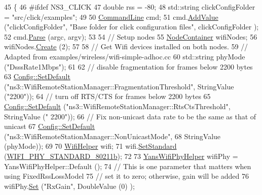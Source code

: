 \begin{DoxyCode}
45 \{
46 \textcolor{preprocessor}{#ifdef NS3\_CLICK}
47   \textcolor{keywordtype}{double} rss = -80;
48   std::string clickConfigFolder = \textcolor{stringliteral}{"src/click/examples"};
49 
50   \hyperlink{classns3_1_1CommandLine}{CommandLine} cmd;
51   cmd.\hyperlink{classns3_1_1CommandLine_addcfb546c7ad4c8bd0965654d55beb8e}{AddValue} (\textcolor{stringliteral}{"clickConfigFolder"}, \textcolor{stringliteral}{"Base folder for click configuration files"}, clickConfigFolder
      );
52   cmd.\hyperlink{classns3_1_1CommandLine_a5c10b85b3207e5ecb48d907966923156}{Parse} (argc, argv);
53 
54   \textcolor{comment}{// Setup nodes}
55   \hyperlink{classns3_1_1NodeContainer}{NodeContainer} wifiNodes;
56   wifiNodes.\hyperlink{classns3_1_1NodeContainer_a787f059e2813e8b951cc6914d11dfe69}{Create} (2);
57 
58   \textcolor{comment}{// Get Wifi devices installed on both nodes.}
59   \textcolor{comment}{// Adapted from examples/wireless/wifi-simple-adhoc.cc}
60   std::string phyMode (\textcolor{stringliteral}{"DsssRate1Mbps"});
61 
62   \textcolor{comment}{// disable fragmentation for frames below 2200 bytes}
63   \hyperlink{group__config_ga2e7882df849d8ba4aaad31c934c40c06}{Config::SetDefault} (\textcolor{stringliteral}{"ns3::WifiRemoteStationManager::FragmentationThreshold"}, 
      StringValue (\textcolor{stringliteral}{"2200"}));
64   \textcolor{comment}{// turn off RTS/CTS for frames below 2200 bytes}
65   \hyperlink{group__config_ga2e7882df849d8ba4aaad31c934c40c06}{Config::SetDefault} (\textcolor{stringliteral}{"ns3::WifiRemoteStationManager::RtsCtsThreshold"}, StringValue (\textcolor{stringliteral}{"
      2200"}));
66   \textcolor{comment}{// Fix non-unicast data rate to be the same as that of unicast}
67   \hyperlink{group__config_ga2e7882df849d8ba4aaad31c934c40c06}{Config::SetDefault} (\textcolor{stringliteral}{"ns3::WifiRemoteStationManager::NonUnicastMode"},
68                       StringValue (phyMode));
69 
70   \hyperlink{classns3_1_1WifiHelper}{WifiHelper} wifi;
71   wifi.\hyperlink{classns3_1_1WifiHelper_aa54f3e61527ef8de318d310045bc5dfd}{SetStandard} (\hyperlink{group__wifi_gga1299834f4e1c615af3ca738033b76a49a77e1cc9f77a0bce8e2bc82cbef437b5a}{WIFI\_PHY\_STANDARD\_80211b});
72 
73   \hyperlink{classns3_1_1YansWifiPhyHelper}{YansWifiPhyHelper} wifiPhy =  YansWifiPhyHelper::Default ();
74   \textcolor{comment}{// This is one parameter that matters when using FixedRssLossModel}
75   \textcolor{comment}{// set it to zero; otherwise, gain will be added}
76   wifiPhy.\hyperlink{classns3_1_1WifiPhyHelper_a2527d6d7b29f717fd7436166c5f05f1a}{Set} (\textcolor{stringliteral}{"RxGain"}, DoubleValue (0) );

\end{DoxyCode}
